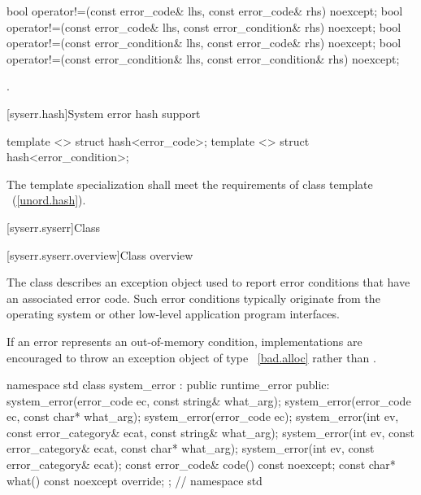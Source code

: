 %
%
\begin{itemdecl}
bool operator!=(const error_code& lhs, const error_code& rhs) noexcept;
bool operator!=(const error_code& lhs, const error_condition& rhs) noexcept;
bool operator!=(const error_condition& lhs, const error_code& rhs) noexcept;
bool operator!=(const error_condition& lhs, const error_condition& rhs) noexcept;
\end{itemdecl}

\begin{itemdescr}
\pnum
\returns {}.
\end{itemdescr}

[syserr.hash]{System error hash support}

%
\begin{itemdecl}
template <> struct hash<error_code>;
template <> struct hash<error_condition>;
\end{itemdecl}

\begin{itemdescr}
\pnum The template specialization shall meet the requirements of class template
~(\ref{unord.hash}).
\end{itemdescr}

[syserr.syserr]{Class }

[syserr.syserr.overview]{Class  overview}

\pnum
The class  describes an exception object used to
report error conditions that have an associated error code. Such error
conditions typically originate from the operating system or other low-level
application program interfaces.

\pnum
\begin{note} If an error represents an out-of-memory condition, implementations are
encouraged to throw an exception object of type ~\ref{bad.alloc} rather
than . \end{note}

%
\begin{codeblock}
namespace std {
  class system_error : public runtime_error {
  public:
    system_error(error_code ec, const string& what_arg);
    system_error(error_code ec, const char* what_arg);
    system_error(error_code ec);
    system_error(int ev, const error_category& ecat,
        const string& what_arg);
    system_error(int ev, const error_category& ecat,
        const char* what_arg);
    system_error(int ev, const error_category& ecat);
    const error_code& code() const noexcept;
    const char* what() const noexcept override;
  };
}   // namespace std
\end{codeblock}

